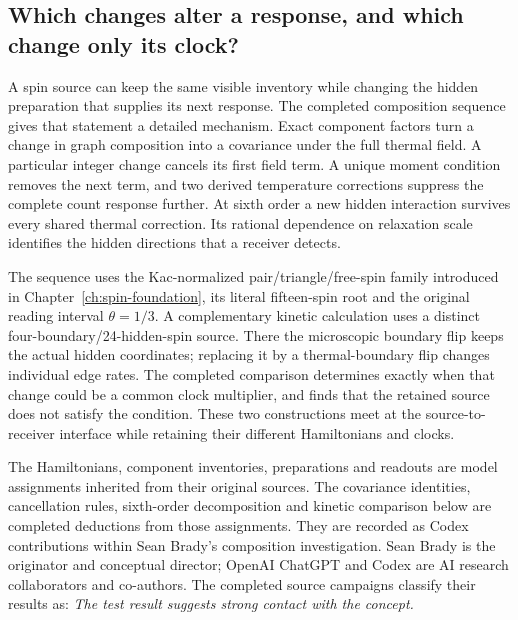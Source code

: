 \label{ch:spin-composition}

\subsection{Which changes alter a response, and which change only its clock?}

A spin source can keep the same visible inventory while changing the hidden preparation that supplies its next response. The completed composition sequence gives that statement a detailed mechanism. Exact component factors turn a change in graph composition into a covariance under the full thermal field. A particular integer change cancels its first field term. A unique moment condition removes the next term, and two derived temperature corrections suppress the complete count response further. At sixth order a new hidden interaction survives every shared thermal correction. Its rational dependence on relaxation scale identifies the hidden directions that a receiver detects.

The sequence uses the Kac-normalized pair/triangle/free-spin family introduced in Chapter~\ref{ch:spin-foundation}, its literal fifteen-spin root and the original reading interval $\theta=1/3$. A complementary kinetic calculation uses a distinct four-boundary/24-hidden-spin source. There the microscopic boundary flip keeps the actual hidden coordinates; replacing it by a thermal-boundary flip changes individual edge rates. The completed comparison determines exactly when that change could be a common clock multiplier, and finds that the retained source does not satisfy the condition. These two constructions meet at the source-to-receiver interface while retaining their different Hamiltonians and clocks.

The Hamiltonians, component inventories, preparations and readouts are model assignments inherited from their original sources. The covariance identities, cancellation rules, sixth-order decomposition and kinetic comparison below are completed deductions from those assignments. They are recorded as Codex contributions within Sean Brady's composition investigation. Sean Brady is the originator and conceptual director; OpenAI ChatGPT and Codex are AI research collaborators and co-authors. The completed source campaigns classify their results as: \emph{The test result suggests strong contact with the concept.}

